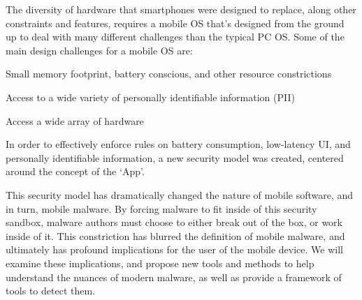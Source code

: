 The diversity of hardware that smartphones were designed to replace, along other constraints and features, requires a mobile OS that’s designed from the ground up to deal with many different challenges than the typical PC OS. Some of the main design challenges for a mobile OS are: 
\begin{smitemize}

\item Small memory footprint, battery conscious, and other resource constrictions

\item Access to a wide variety of personally identifiable information (PII)

\item Access a wide array of hardware

\end{smitemize}
In order to effectively enforce rules on battery consumption, low-latency UI, and personally identifiable information, a new security model was created, centered around the concept of the ‘App’. 

This security model has dramatically changed the nature of mobile software, and in turn, mobile malware. By forcing malware to fit inside of this security sandbox, malware authors must choose to either break out of the box, or work inside of it. This constriction has blurred the definition of mobile malware, and ultimately has profound implications for the user of the mobile device. We will examine these implications, and propose new tools and methods to help understand the nuances of modern malware, as well as provide a framework of tools to detect them.

